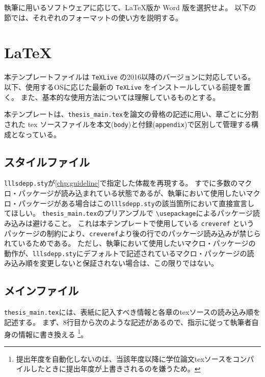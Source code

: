 		\noindent
		執筆に用いるソフトウェアに応じて、\LaTeX 版か Word \textsuperscript{\textregistered} 版を選択せよ。
		以下の節では、それぞれのフォーマットの使い方を説明する。

	\section{LaTeX}
		\label{sec:latex}

		本テンプレートファイルは \texttt{TeXLive} の2016以降のバージョンに対応している。
		以下、使用するOSに応じた最新の \texttt{TeXLive} をインストールしている前提を置く。
		また、基本的な使用方法については理解しているものとする。

		本テンプレートは、\texttt{thesis\_main.tex}を論文の骨格の記述に用い、章ごとに分割された tex ソースファイルを本文(\texttt{body})と付録(\texttt{appendix})で区別して管理する構成となっている。

		\subsection{スタイルファイル}
			\label{sub:style_file}

			\texttt{lllsdepp.sty}が\cref{chp:guideline}で指定した体裁を再現する。
			すでに多数のマクロ・パッケージが読み込まれている状態であるが、執筆において使用したいマクロ・パッケージがある場合はこの\texttt{lllsdepp.sty}の該当箇所において直接宣言してほしい。
			\texttt{thesis\_main.tex}のプリアンブルで \texttt{\textbackslash usepackage}によるパッケージ読み込みは避けること。
			これは本テンプレートで使用している \texttt{creveref} というパッケージの制約により、\texttt{creveref}より後の行でのパッケージ読み込みが禁じられているためである。
			ただし、執筆において使用したいマクロ・パッケージの動作が、\texttt{lllsdepp.sty}にデフォルトで記述されているマクロ・パッケージの読み込み順を変更しないと保証されない場合は、この限りではない。



		\subsection{メインファイル}
			\label{sub:メインファイル}

			\texttt{thesis\_main.tex}には、表紙に記入すべき情報と各章のtexソースの読み込み順を記述する。
			まず、8行目から次のような記述があるので、指示に従って執筆者自身の情報に書き換える
			\footnote{提出年度を自動化しないのは、当該年度以降に学位論文texソースをコンパイルしたときに提出年度が上書きされるのを嫌うため。}。

